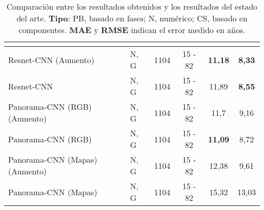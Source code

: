 \begin{table}[ht!]
{\begin{tabular}{llcccc}
 &  & \multicolumn{1}{l}{} & \multicolumn{1}{l}{} & \multicolumn{1}{l}{} & \multicolumn{1}{l}{} \\ \hline
\multicolumn{1}{|l|}{Resnet-CNN (Aumento)} & \multicolumn{1}{l|}{N, G} & \multicolumn{1}{c|}{1104} & \multicolumn{1}{c|}{15 - 82} & \multicolumn{1}{c|}{\textbf{11,18}} & \multicolumn{1}{c|}{\textbf{8,33}} \\ \hline
\multicolumn{1}{|l|}{Resnet-CNN} & \multicolumn{1}{l|}{N, G} & \multicolumn{1}{c|}{1104} & \multicolumn{1}{c|}{15 - 82} & \multicolumn{1}{c|}{11,89} & \multicolumn{1}{c|}{\textbf{8,55}} \\ \hline
\multicolumn{1}{|l|}{Panorama-CNN (RGB) (Aumento)} & \multicolumn{1}{l|}{N, G} & \multicolumn{1}{c|}{1104} & \multicolumn{1}{c|}{15 - 82} & \multicolumn{1}{c|}{11,7} & \multicolumn{1}{c|}{9,16} \\ \hline
\multicolumn{1}{|l|}{Panorama-CNN (RGB)} & \multicolumn{1}{l|}{N, G} & \multicolumn{1}{c|}{1104} & \multicolumn{1}{c|}{15 - 82} & \multicolumn{1}{c|}{\textbf{11,09}} & \multicolumn{1}{c|}{8,72} \\ \hline
\multicolumn{1}{|l|}{Panorama-CNN (Mapas) (Aumento)} & \multicolumn{1}{l|}{N, G} & \multicolumn{1}{c|}{1104} & \multicolumn{1}{c|}{15 - 82} & \multicolumn{1}{c|}{12,38} & \multicolumn{1}{c|}{9,61} \\ \hline
\multicolumn{1}{|l|}{Panorama-CNN (Mapas)} & \multicolumn{1}{l|}{N, G} & \multicolumn{1}{c|}{1104} & \multicolumn{1}{c|}{15 - 82} & \multicolumn{1}{c|}{15,32} & \multicolumn{1}{c|}{13,03} \\ \hline
\end{tabular}%
}
\caption[Comparación entre los resultados obtenidos y los resultados del estado del arte.]{Comparación entre los resultados obtenidos y los resultados del estado del arte. \textbf{Tipo}: PB, basado en fases; N, numérico; CS, basado en componentes. \textbf{MAE} y \textbf{RMSE} indican el error medido en años.}
\label{tab:statevsres}
\end{table}


